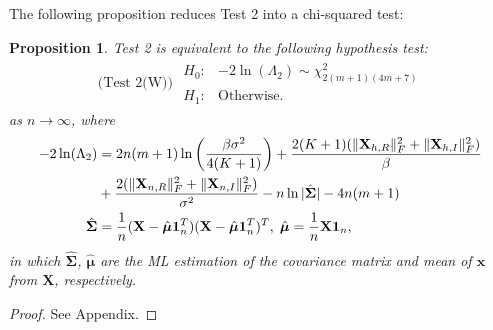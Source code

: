 \documentclass[journal,draftcls,onecolumn,12pt,twoside]{IEEEtran}
\newtheorem{proposition}{Proposition}
\begin{document}
The following proposition reduces Test 2 into a chi-squared test:
\begin{proposition}
  \label{prop:test2}
  Test 2 is equivalent to the following hypothesis test:
  \begin{align}
    \mbox{(Test 2(W)) } \begin{array}{ll}H_0: & -2\ln(\Lambda_2) \sim
    \chi_{2(m+1)(4m+7)}^2 \\ H_1: & \mbox{Otherwise.}
    \end{array}
  \end{align}
  as $n\rightarrow\infty$, where
  \begin{align}
    -2\ln(\Lambda_2) & =
    2n(m+1)\ln\left(\frac{\beta\sigma^2}{4(K+1)}\right)
    +
    \frac{2(K+1)(\|\mathbf{X}_{h,R}\|_F^2 + \|\mathbf{X}_{h,I}\|_F^2)}{\beta}
    \notag \\ &+
    \frac{2(\|\mathbf{X}_{n,R}\|_F^2 + \|\mathbf{X}_{n,I}\|_F^2)}{\sigma^2}
    - n\ln|\hat{\mathbf{\Sigma}}| - 4n(m+1)\\
    \hat{\mathbf{\Sigma}} & = \frac{1}{n}(\mathbf{X}
    -\hat{\bm{\mu}}\mathbf{1}_n^T)(\mathbf{X}
    -\hat{\bm{\mu}}\mathbf{1}_n^T)^T,\;\hat{\bm{\mu}} =
    \frac{1}{n}\mathbf{X}\mathbf{1}_n,\label{eq:sigma_mu_ml}
  \end{align}
  in which $\hat{\bm{\Sigma}}$, $\hat{\bm{\mu}}$ are the ML estimation of the
  covariance matrix and mean of $\mathbf{x}$ from $\mathbf{X}$, respectively.
\end{proposition}
\begin{proof}
  See Appendix.
\end{proof}
\end{document}
